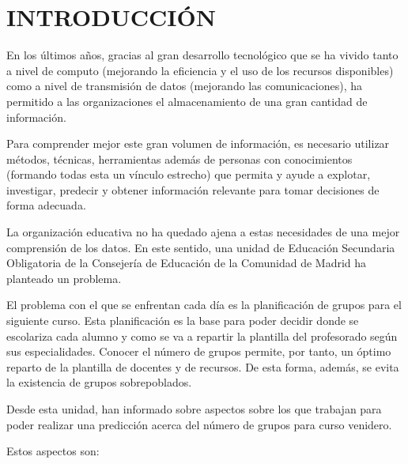 \section{INTRODUCCIÓN}

En los últimos años, gracias al gran desarrollo tecnológico que se ha vivido tanto a nivel de computo (mejorando la eficiencia y el uso de los recursos disponibles) como a nivel de transmisión de datos (mejorando las comunicaciones), ha permitido a las organizaciones el almacenamiento de una gran cantidad de información.

Para comprender mejor este gran volumen de información, es necesario utilizar métodos, técnicas, herramientas además de personas con conocimientos (formando todas esta un vínculo estrecho) que permita y ayude a explotar, investigar, predecir y obtener información relevante para tomar decisiones de forma adecuada.

La organización educativa no ha quedado ajena a estas necesidades de una mejor comprensión de los datos. En este sentido, una unidad de Educación Secundaria Obligatoria de la Consejería de Educación de la Comunidad de Madrid ha planteado un problema.

El problema con el que se enfrentan cada día es la planificación de grupos para el siguiente curso. Esta planificación es la base para poder decidir donde se escolariza cada alumno y como se va a repartir la plantilla del profesorado según sus especialidades. Conocer el número de grupos permite, por tanto, un óptimo reparto de la plantilla de docentes y de recursos. De esta forma, además, se evita la existencia de grupos sobrepoblados.

Desde esta unidad, han informado sobre aspectos sobre los que trabajan para poder realizar una predicción acerca del número de grupos para curso venidero. 

Estos aspectos son:

